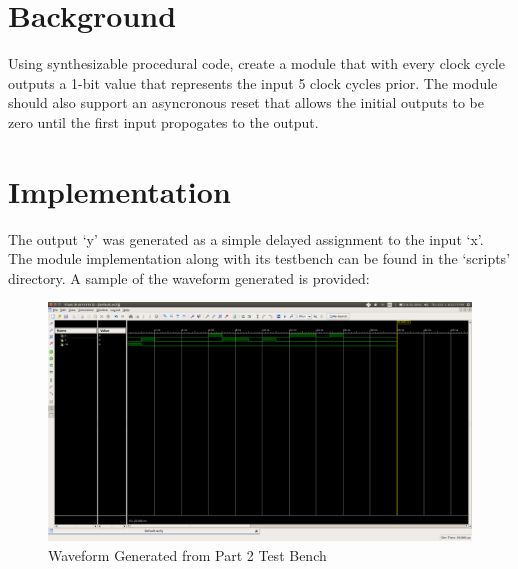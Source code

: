 \documentclass[paper=usletter, fontsize=12pt]{article}
\begin{document}
    \vspace{-0.1in}

    \section{Background}
    Using synthesizable procedural code, create a module that with every clock cycle outputs a 1-bit value that represents the input 5 clock cycles prior. The module should also support an asyncronous reset that allows the initial outputs to be zero until the first input propogates to the output.

    \section{Implementation}
    The output `y' was generated as a simple delayed assignment to the input `x'. The module implementation along with its testbench can be found in the `scripts' directory. A sample of the waveform generated is provided:

    \begin{figure}[ht]
        \begin{center}
            \includegraphics[width=1\textwidth]{wav.png}
            \caption{Waveform Generated from Part 2 Test Bench} \label{fig:wav}
        \end{center}
    \end{figure}
\end{document}
